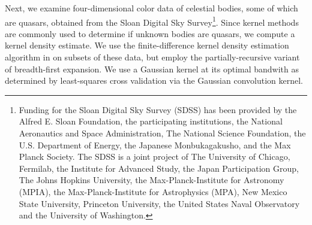 \documentclass[twoside,leqno,twocolumn]{article}
\begin{document}
Next, we examine four-dimensional color data of celestial bodies, some of which are quasars, obtained from the Sloan Digital Sky Survey\footnote{
  Funding for the Sloan Digital Sky Survey (SDSS) has been provided by the Alfred E. Sloan Foundation, the participating institutions, the National Aeronautics and Space Administration, The National Science Foundation, the U.S. Department of Energy, the Japanese Monbukagakusho, and the Max Planck Society. The SDSS is a joint project of The University of Chicago, Fermilab, the Institute for Advanced Study, the Japan Participation Group, The Johns Hopkins University, the Max-Planck-Institute for Astronomy (MPIA), the Max-Planck-Institute for Astrophysics (MPA), New Mexico State University, Princeton University, the United States Naval Observatory and the University of Washington.
}.
Since kernel methods are commonly used to determine if unknown bodies are quasars, we compute a kernel density estimate.
We use the finite-difference kernel density estimation algorithm in \cite{gray_kde} on subsets of these data, but employ the partially-recursive variant of breadth-first expansion.
We use a Gaussian kernel at its optimal bandwith as determined by least-squares cross validation via the Gaussian convolution kernel.
\end{document}
